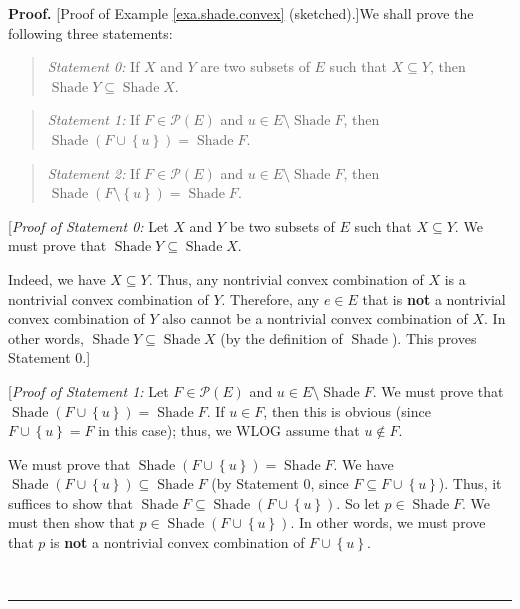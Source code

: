 \documentclass[numbers=enddot,12pt,final,onecolumn]{scrartcl}%
\theoremstyle{definition}
\newenvironment{statement}{\begin{quote}}{\end{quote}}
\newenvironment{proof}[1][Proof]{\noindent\textbf{#1.} }{\ \rule{0.5em}{0.5em}}
\newenvironment{verlong}{}{}
\begin{document}
\begin{verlong}
\begin{proof}
[Proof of Example \ref{exa.shade.convex} (sketched).]We shall prove the
following three statements:

\begin{statement}
\textit{Statement 0:} If $X$ and $Y$ are two subsets of $E$ such that
$X\subseteq Y$, then $\operatorname*{Shade}Y\subseteq\operatorname*{Shade}X$.
\end{statement}

\begin{statement}
\textit{Statement 1:} If $F\in\mathcal{P}\left(  E\right)  $ and $u\in
E\setminus\operatorname*{Shade}F$, then $\operatorname*{Shade}\left(
F\cup\left\{  u\right\}  \right)  =\operatorname*{Shade}F$.
\end{statement}

\begin{statement}
\textit{Statement 2:} If $F\in\mathcal{P}\left(  E\right)  $ and $u\in
E\setminus\operatorname*{Shade}F$, then $\operatorname*{Shade}\left(
F\setminus\left\{  u\right\}  \right)  =\operatorname*{Shade}F$.
\end{statement}

[\textit{Proof of Statement 0:} Let $X$ and $Y$ be two subsets of $E$ such
that $X\subseteq Y$. We must prove that $\operatorname*{Shade}Y\subseteq
\operatorname*{Shade}X$.

Indeed, we have $X\subseteq Y$. Thus, any nontrivial convex combination of $X$
is a nontrivial convex combination of $Y$. Therefore, any $e\in E$ that is
\textbf{not} a nontrivial convex combination of $Y$ also cannot be a
nontrivial convex combination of $X$. In other words, $\operatorname*{Shade}%
Y\subseteq\operatorname*{Shade}X$ (by the definition of $\operatorname*{Shade}%
$). This proves Statement 0.]

[\textit{Proof of Statement 1:} Let $F\in\mathcal{P}\left(  E\right)  $ and
$u\in E\setminus\operatorname*{Shade}F$. We must prove that
$\operatorname*{Shade}\left(  F\cup\left\{  u\right\}  \right)
=\operatorname*{Shade}F$. If $u\in F$, then this is obvious (since
$F\cup\left\{  u\right\}  =F$ in this case); thus, we WLOG assume that
$u\notin F$.

We must prove that $\operatorname*{Shade}\left(  F\cup\left\{  u\right\}
\right)  =\operatorname*{Shade}F$. We have $\operatorname*{Shade}\left(
F\cup\left\{  u\right\}  \right)  \subseteq\operatorname*{Shade}F$ (by
Statement 0, since $F\subseteq F\cup\left\{  u\right\}  $). Thus, it suffices
to show that $\operatorname*{Shade}F\subseteq\operatorname*{Shade}\left(
F\cup\left\{  u\right\}  \right)  $. So let $p\in\operatorname*{Shade}F$. We
must then show that $p\in\operatorname*{Shade}\left(  F\cup\left\{  u\right\}
\right)  $. In other words, we must prove that $p$ is \textbf{not} a
nontrivial convex combination of $F\cup\left\{  u\right\}  $.


\end{proof}
\end{verlong}
\end{document}
